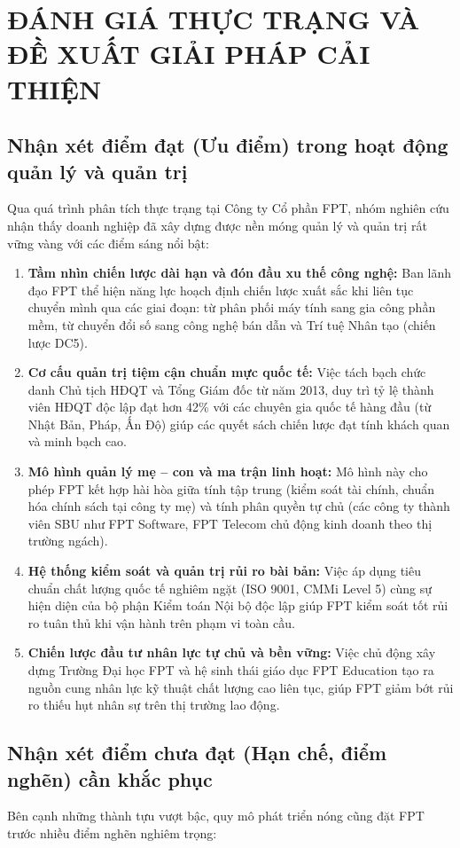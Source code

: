 \section{ĐÁNH GIÁ THỰC TRẠNG VÀ ĐỀ XUẤT GIẢI PHÁP CẢI THIỆN}

\subsection{Nhận xét điểm đạt (Ưu điểm) trong hoạt động quản lý và quản trị}
Qua quá trình phân tích thực trạng tại Công ty Cổ phần FPT, nhóm nghiên cứu nhận thấy doanh nghiệp đã xây dựng được nền móng quản lý và quản trị rất vững vàng với các điểm sáng nổi bật:

\begin{enumerate}
    \item \textbf{Tầm nhìn chiến lược dài hạn và đón đầu xu thế công nghệ:} Ban lãnh đạo FPT thể hiện năng lực hoạch định chiến lược xuất sắc khi liên tục chuyển mình qua các giai đoạn: từ phân phối máy tính sang gia công phần mềm, từ chuyển đổi số sang công nghệ bán dẫn và Trí tuệ Nhân tạo (chiến lược DC5).
    \item \textbf{Cơ cấu quản trị tiệm cận chuẩn mực quốc tế:} Việc tách bạch chức danh Chủ tịch HĐQT và Tổng Giám đốc từ năm 2013, duy trì tỷ lệ thành viên HĐQT độc lập đạt hơn 42\% với các chuyên gia quốc tế hàng đầu (từ Nhật Bản, Pháp, Ấn Độ) giúp các quyết sách chiến lược đạt tính khách quan và minh bạch cao.
    \item \textbf{Mô hình quản lý mẹ -- con và ma trận linh hoạt:} Mô hình này cho phép FPT kết hợp hài hòa giữa tính tập trung (kiểm soát tài chính, chuẩn hóa chính sách tại công ty mẹ) và tính phân quyền tự chủ (các công ty thành viên SBU như FPT Software, FPT Telecom chủ động kinh doanh theo thị trường ngách).
    \item \textbf{Hệ thống kiểm soát và quản trị rủi ro bài bản:} Việc áp dụng tiêu chuẩn chất lượng quốc tế nghiêm ngặt (ISO 9001, CMMi Level 5) cùng sự hiện diện của bộ phận Kiểm toán Nội bộ độc lập giúp FPT kiểm soát tốt rủi ro tuân thủ khi vận hành trên phạm vi toàn cầu.
    \item \textbf{Chiến lược đầu tư nhân lực tự chủ và bền vững:} Việc chủ động xây dựng Trường Đại học FPT và hệ sinh thái giáo dục FPT Education tạo ra nguồn cung nhân lực kỹ thuật chất lượng cao liên tục, giúp FPT giảm bớt rủi ro thiếu hụt nhân sự trên thị trường lao động.
\end{enumerate}

\subsection{Nhận xét điểm chưa đạt (Hạn chế, điểm nghẽn) cần khắc phục}
Bên cạnh những thành tựu vượt bậc, quy mô phát triển nóng cũng đặt FPT trước nhiều điểm nghẽn nghiêm trọng:

